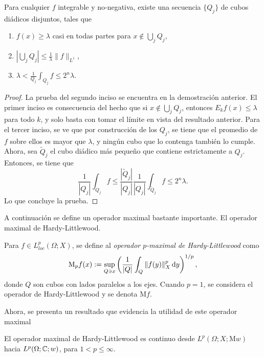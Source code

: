 \begin{theorem}\label{theo:Calderon-Zygmund}
	Para cualquier $f$ integrable y no-negativa, existe una secuencia $\{Q_j\}$ de cubos diádicos disjuntos, tales que 
	\begin{enumerate}
		\item $f(x)\geq \lambda$ casi en todas partes para $x\notin \bigcup_j Q_j$,
		\item $\left|\bigcup_jQ_j\right| \leq \frac{1}{\lambda}\|f\|_{L^1}$,
		\item $\lambda < \frac{1}{Q_j}\int_{Q_j}f \leq 2^n\lambda$.
	\end{enumerate}
\end{theorem}
\begin{proof}
	La prueba del segundo inciso se encuentra en la demostración anterior. El primer inciso es consecuencia del hecho que si $x\notin\bigcup_jQ_j$, entonces $E_kf(x) \leq \lambda$ para todo $k$, y solo basta con tomar el límite en vista del resultado anterior. Para el tercer inciso, se ve que  por construcción de los $Q_j$, se tiene que el promedio de $f$ sobre ellos es mayor que $\lambda$, y ningún cubo que lo contenga también lo cumple. Ahora, sea $\tilde{Q}_j$ el cubo diádico más pequeño que contiene estrictamente a $Q_j$. Entonces, se tiene que 
	\begin{equation*}
		\frac{1}{|Q_j|}\int_{Q_j} f \leq \frac{|\tilde{Q}_j|}{|Q_j|}\frac{1}{|Q_j|} \int_{\tilde{Q}_j} f \leq 2^n\lambda.
	\end{equation*}
	Lo que concluye la prueba.
\end{proof}
A continuación se define un operador maximal bastante importante. El operador maximal de Hardy-Littlewood.
\begin{definition}
	Para $f\in L^p_{loc}(\Omega;X)$, se define al \textit{operador $p$-maximal de Hardy-Littlewood} como 
	\begin{equation*}
		\mathrm{M}_pf(x) := \sup_{Q\ni x} \left(\frac{1}{|Q|}\int_Q \|f(y)\|_X^p\mathop{}\!\mathrm{d} y\right)^{1/p},
	\end{equation*}
	donde $Q$ son cubos con lados paralelos a los ejes. Cuando $p=1$, se considera el operador de Hardy-Littlewood y se denota $\mathrm{M}f$.
\end{definition}
Ahora, se presenta un resultado que evidencia la utilidad de este operador maximal
\begin{theorem}\label{theo:Hardy-Littlewood}
	El operador maximal de Hardy-Littlewood es continuo desde $L^p(\Omega;X;\mathrm{M}w)$ hacia $L^p(\Omega;\mathbb{C};w)$, para $1<p\leq\infty$.
\end{theorem}
